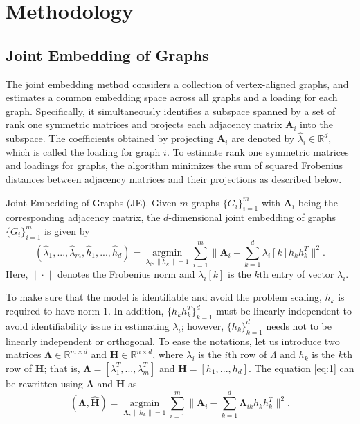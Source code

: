 \documentclass[10pt,journal,compsoc]{IEEEtran}
\newenvironment{definition}[1][Definition]{\begin{trivlist}
		\item[\hskip \labelsep {\bfseries #1}]}{\end{trivlist}}
\newcommand{\bA}{\mathbf{A}}
\newcommand{\bH}{\mathbf{H}}
\newcommand{\bLambda}{\mathbf{\Lambda}}
\begin{document}
\section{Methodology}
\subsection{Joint Embedding of Graphs}
The joint embedding method considers a collection of vertex-aligned graphs, and estimates a common embedding space across all graphs and a loading for each graph. Specifically, it simultaneously identifies a subspace spanned by a set of rank one symmetric matrices and projects each adjacency matrix $\bA_i$ into the subspace. The coefficients obtained by projecting $\bA_i$ are denoted by $\hat{\lambda}_i \in \mathbb{R}^d$, which is called the loading for graph $i$. To estimate rank one symmetric matrices and loadings for graphs, the algorithm minimizes the sum of squared Frobenius distances between adjacency matrices and their projections as described below.
\begin{definition} Joint Embedding of Graphs (JE). Given $m$ graphs $\{G_i \} _{i=1}^{m}$ with $\bA_i$ being the corresponding adjacency matrix, the $d$-dimensional joint embedding of graphs $\{G_i \} _{i=1}^{m}$ is given by
\begin{equation}\label{eq:1}
 (\hat{\lambda}_1,...,\hat{\lambda}_m,\hat{h}_1,...,\hat{h}_d) = \underset{\lambda_i,\|h_k\|=1}{\operatorname{argmin}} \sum\limits_{i=1}^{m} \| \bA_i- \sum\limits_{k=1}^{d} \lambda_{i}[k] h_k h_k^T \|  ^2.  
\end{equation}
Here, $\| \cdot \|$ denotes the Frobenius norm and $\lambda_{i}[k]$ is the $k$th entry of vector $\lambda_i$.
\end{definition}
To make sure that the model is identifiable and avoid the problem scaling, $h_k$ is required to have norm $1$. In addition, $\{h_k h_k^T\}_{k=1}^d$ must be linearly independent to avoid identifiability issue in estimating $\lambda_i$; however, $\{h_k\}_{k=1}^d$ needs not to be linearly independent or orthogonal. To ease the notations, let us introduce two matrices $\bLambda \in \mathbb{R}^{m \times d}$ and $\bH\in \mathbb{R}^{n \times d}$, where $\lambda_i$ is the $i$th row of $\Lambda$ and $h_k$ is the $k$th row of $\bH$; that is, $\bLambda=[\lambda_1^T,...,\lambda_m^T]$ and $\bH=[h_1,...,h_d]$. The equation \eqref{eq:1} can be rewritten using $\bLambda$ and $\bH$ as
\begin{equation*}
(\hat{\bLambda},\hat{\bH}) = \underset{\bLambda,\|h_k\|=1}{\operatorname{argmin}} \sum\limits_{i=1}^{m} \| \bA_i- \sum\limits_{k=1}^{d} \bLambda_{ik} h_k h_k^T \|  ^2.  
\end{equation*}
\end{document}
